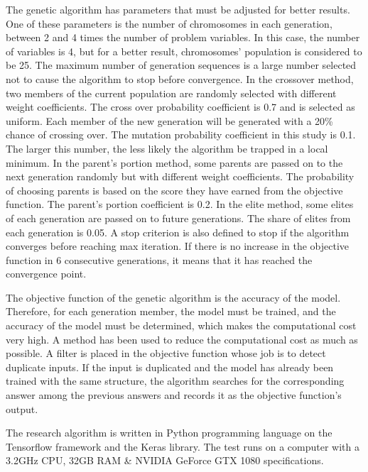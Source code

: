 The genetic algorithm has parameters that must be adjusted for better results. One of these parameters is the number of chromosomes in each generation, between 2 and 4 times the number of problem variables. In this case, the number of variables is 4, but for a better result, chromosomes' population is considered to be 25. The maximum number of generation sequences is a large number selected not to cause the algorithm to stop before convergence. In the crossover method, two members of the current population are randomly selected with different weight coefficients. The cross over probability coefficient is 0.7 and is selected as uniform. Each member of the new generation will be generated with a 20\% chance of crossing over. The mutation probability coefficient in this study is 0.1. The larger this number, the less likely the algorithm be trapped in a local minimum. In the parent's portion method, some parents are passed on to the next generation randomly but with different weight coefficients. The probability of choosing parents is based on the score they have earned from the objective function. The parent's portion coefficient is 0.2.  In the elite method, some elites of each generation are passed on to future generations. The share of elites from each generation is 0.05. A stop criterion is also defined to stop if the algorithm converges before reaching max iteration. If there is no increase in the objective function in 6 consecutive generations, it means that it has reached the convergence point.

The objective function of the genetic algorithm is the accuracy of the model. Therefore, for each generation member, the model must be trained, and the accuracy of the model must be determined, which makes the computational cost very high. A method has been used to reduce the computational cost as much as possible. A filter is placed in the objective function whose job is to detect duplicate inputs. If the input is duplicated and the model has already been trained with the same structure, the algorithm searches for the corresponding answer among the previous answers and records it as the objective function's output.


The research algorithm is written in Python programming language on the Tensorflow framework and the Keras library. The test runs on a computer with a 3.2GHz CPU, 32GB RAM \&  NVIDIA GeForce GTX 1080 specifications.
